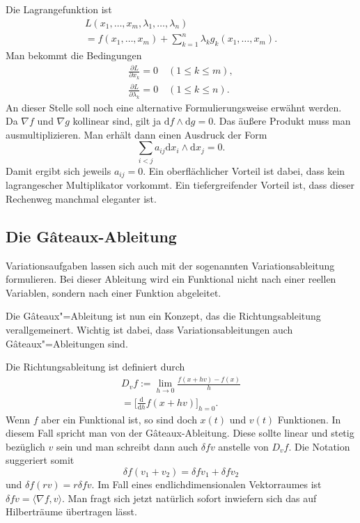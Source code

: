 \documentclass[a4paper,10pt,fleqn,twocolumn,twoside]{article}
\begin{document}
Die Lagrangefunktion ist
\begin{gather*}
L(x_1,\ldots,x_m,\lambda_1,\ldots,\lambda_n)\\
= f(x_1,\ldots,x_m)+\sum_{k=1}^n \lambda_k g_k(x_1,\ldots,x_m).
\end{gather*}
Man bekommt die Bedingungen
\begin{gather*}
\frac{\partial L}{\partial x_k}=0 \quad (1\le k\le m),\\
\frac{\partial L}{\partial \lambda_k}=0 \quad (1\le k\le n).
\end{gather*}
An dieser Stelle soll noch eine alternative Formulierungsweise
erwähnt werden. Da \(\nabla f\) und \(\nabla g\) kollinear sind,
gilt ja \(\mathrm df\wedge\mathrm dg=0\). Das äußere Produkt muss
man ausmultiplizieren. Man erhält dann einen Ausdruck der Form
\[\sum_{i<j} a_{ij}\mathrm dx_i\wedge\mathrm dx_j=0.\]
Damit ergibt sich jeweils \(a_{ij}=0\). Ein oberflächlicher Vorteil ist dabei, dass
kein lagrangescher Multiplikator vorkommt. Ein tiefergreifender Vorteil ist,
dass dieser Rechenweg manchmal eleganter ist.

\subsection{Die Gâteaux-Ableitung}

Variationsaufgaben lassen sich auch mit der sogenannten
Variationsableitung formulieren. Bei dieser Ableitung wird ein Funktional nicht
nach einer reellen Variablen, sondern nach einer Funktion abgeleitet.

Die Gâteaux"=Ableitung ist nun ein Konzept, das die Richtungsableitung
verallgemeinert. Wichtig ist dabei, dass Variationsableitungen auch
Gâteaux"=Ableitungen sind.

Die Richtungsableitung ist definiert durch
\begin{gather*}
D_v f := \lim_{h\rightarrow 0} \frac{f(x+hv)-f(x)}{h}\\
= \Big[\frac{\mathrm d}{\mathrm dh}f(x+hv)\Big]_{h=0}.
\end{gather*}
Wenn \(f\) aber ein Funktional ist, so sind doch \(x(t)\) und \(v(t)\)
Funktionen. In diesem Fall spricht man von der Gâteaux-Ableitung.
Diese sollte linear und stetig bezüglich \(v\) sein und man schreibt dann
auch \(\delta f v\) anstelle von \(D_v f\). Die Notation suggeriert
somit
\[\delta f(v_1+v_2) = \delta fv_1 + \delta fv_2\]
und \(\delta f(rv) = r\delta fv\). Im Fall eines endlichdimensionalen
Vektorraumes ist \(\delta f v = \langle \nabla f,v\rangle\). Man
fragt sich jetzt natürlich sofort inwiefern sich das auf
Hilberträume übertragen lässt.
\end{document}
